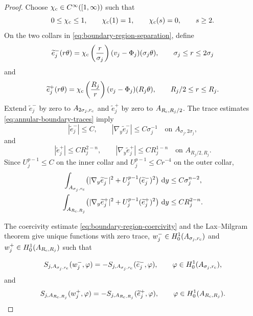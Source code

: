 \documentclass[11pt]{article}
\numberwithin{equation}{section}
\theoremstyle{remark}
\newcommand{\dd}{\mathop{}\!\mathrm{d}}
\begin{document}
\begin{proof}
Choose \(\chi_{\rm c}\in C^\infty([1,\infty))\) such that
\[
 0\le\chi_{\rm c}\le1,\qquad \chi_{\rm c}(1)=1,\qquad
 \chi_{\rm c}(s)=0,\qquad s\ge2.
\]
On the two collars in \eqref{eq:boundary-region-separation}, define
\[
 \widetilde e_j^-(r\theta)=
 \chi_{\rm c}\left(\frac r{\sigma_j}\right)
 (v_j-\Phi_j)(\sigma_j\theta),
 \qquad \sigma_j\le r\le2\sigma_j
\]
and
\[
 \widetilde e_j^+(r\theta)=
 \chi_{\rm c}\left(\frac{R_j}{r}\right)
 (v_j-\Phi_j)(R_j\theta),
 \qquad R_j/2\le r\le R_j.
\]
Extend \(\widetilde e_j^-\) by zero to \(A_{2\sigma_j,r_{\rm c}}\) and
\(\widetilde e_j^+\)
by zero to \(A_{R_{\rm c},R_j/2}\).  The trace estimates
\eqref{eq:annular-boundary-traces} imply
\[
 |\widetilde e_j^-|\le C,\qquad
 |\nabla_y\widetilde e_j^-|\le C\sigma_j^{-1}
 \quad\text{on }A_{\sigma_j,2\sigma_j},
\]
and
\[
 |\widetilde e_j^+|\le CR_j^{2-n},\qquad
 |\nabla_y\widetilde e_j^+|\le CR_j^{1-n}
 \quad\text{on }A_{R_j/2,R_j}.
\]
Since \(U_j^{p-1}\le C\) on the inner collar and
\(U_j^{p-1}\le Cr^{-4}\) on the outer collar,
\begin{equation}\label{eq:explicit-boundary-collar-energy}
 \begin{aligned}
 \int_{A_{\sigma_j,r_{\rm c}}}
 \bigl(|\nabla_y\widetilde e_j^-|^2
      +U_j^{p-1}(\widetilde e_j^-)^2\bigr)\,\dd y
 &\le C\sigma_j^{n-2},\\
 \int_{A_{R_{\rm c},R_j}}
 \bigl(|\nabla_y\widetilde e_j^+|^2
      +U_j^{p-1}(\widetilde e_j^+)^2\bigr)\,\dd y
 &\le CR_j^{2-n}.
 \end{aligned}
\end{equation}

The coercivity estimate  \eqref{eq:boundary-region-coercivity} and the Lax--Milgram
theorem give unique functions with zero trace,
\(w_j^-\in H_0^1(A_{\sigma_j,r_{\rm c}})\) and
\(w_j^+\in H_0^1(A_{R_{\rm c},R_j})\) such that
 
\[
  S_{j,A_{\sigma_j,r_{\rm c}}}(w_j^-,\varphi)
 =- S_{j,A_{\sigma_j,r_{\rm c}}}(\widetilde e_j^-,\varphi),
 \qquad \varphi\in H_0^1(A_{\sigma_j,r_{\rm c}}),
\]
and
\[
  S_{j,A_{R_{\rm c},R_j}}(w_j^+,\varphi)
 =- S_{j,A_{R_{\rm c},R_j}}(\widetilde e_j^+,\varphi),
 \qquad \varphi\in H_0^1(A_{R_{\rm c},R_j}).
\]


\end{proof}
\end{document}
